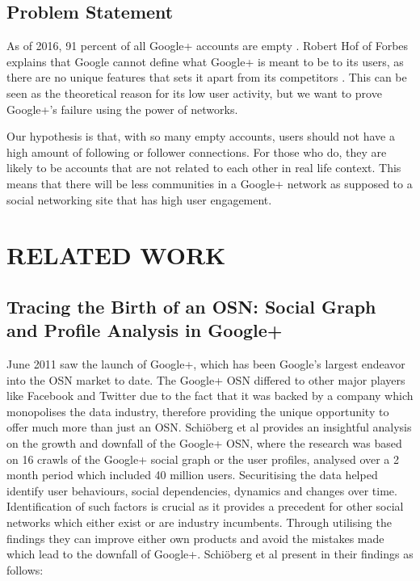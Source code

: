 \documentclass[a4paper, 10pt, conference]{ieeeconf}      %
\begin{document}
\subsection{Problem Statement}
As of 2016, 91 percent of all Google+ accounts are empty \cite{c6}. Robert Hof of Forbes explains that Google cannot define what Google+ is meant to be to its users, as there are no unique features that sets it apart from its competitors \cite{c7}. This can be seen as the theoretical reason for its low user activity, but we want to prove Google+'s failure using the power of networks.

Our hypothesis is that, with so many empty accounts, users should not have a high amount of following or follower connections. For those who do, they are likely to be accounts that are not related to each other in real life context. This means that there will be less communities in a Google+ network as supposed to a social networking site that has high user engagement. 

\section{RELATED WORK}

\subsection{Tracing the Birth of an OSN: Social Graph and Profile Analysis in Google+ \cite{c13}}

June 2011 saw the launch of Google+, which has been Google's largest endeavor into the OSN market to date. The Google+ OSN differed to other major players like Facebook and Twitter due to the fact that it was backed by a company which monopolises the data industry, therefore providing the unique opportunity to offer much more than just an OSN. Schi\"oberg et al \cite{c13} provides an insightful analysis on the growth and downfall of the Google+ OSN, where the research was based on 16 crawls of the Google+ social graph or the user profiles, analysed over a 2 month period which included 40 million users. Securitising the data helped identify user behaviours, social dependencies, dynamics and changes over time. Identification of such factors is crucial as it provides a precedent for other social networks which either exist or are industry incumbents. Through utilising the findings they can improve either own products and avoid the mistakes made which lead to the downfall of Google+. Schi\"oberg et al \cite{c13} present in their findings as follows:
\linebreak
\end{document}
